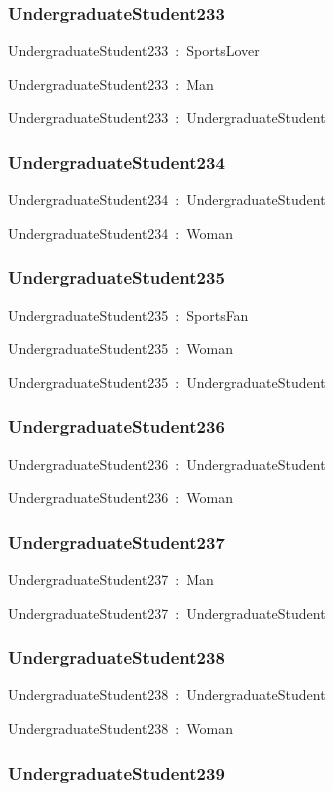 \documentclass{article}
\begin{document}
\subsubsection*{UndergraduateStudent233}

UndergraduateStudent233~:~SportsLover

UndergraduateStudent233~:~Man

UndergraduateStudent233~:~UndergraduateStudent

\subsubsection*{UndergraduateStudent234}

UndergraduateStudent234~:~UndergraduateStudent

UndergraduateStudent234~:~Woman

\subsubsection*{UndergraduateStudent235}

UndergraduateStudent235~:~SportsFan

UndergraduateStudent235~:~Woman

UndergraduateStudent235~:~UndergraduateStudent

\subsubsection*{UndergraduateStudent236}

UndergraduateStudent236~:~UndergraduateStudent

UndergraduateStudent236~:~Woman

\subsubsection*{UndergraduateStudent237}

UndergraduateStudent237~:~Man

UndergraduateStudent237~:~UndergraduateStudent

\subsubsection*{UndergraduateStudent238}

UndergraduateStudent238~:~UndergraduateStudent

UndergraduateStudent238~:~Woman

\subsubsection*{UndergraduateStudent239}
\end{document}
